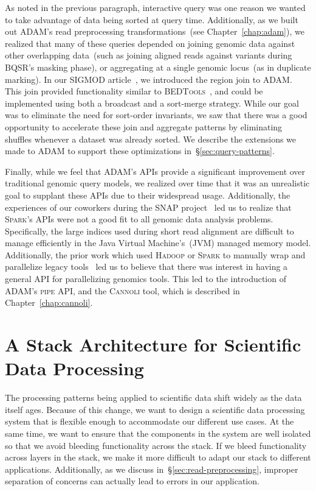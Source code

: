 \documentclass[phd]{ucbthesis}
\begin{document}
As noted in the previous paragraph, interactive query was one reason we wanted
to take advantage of data being sorted at query time. Additionally, as we built
out \textsc{ADAM}'s read preprocessing transformations~(see
Chapter~\ref{chap:adam}), we realized that many of these queries depended on
joining genomic data against other overlapping data~(such as joining aligned
reads against variants during BQSR's masking phase), or aggregating at a single
genomic locus~(as in duplicate marking). In our SIGMOD article~\cite{nothaft15},
we introduced the region join to \textsc{ADAM}. This join provided functionality
similar to \textsc{BEDTools}~\cite{quinlan10}, and could be implemented using
both a broadcast and a sort-merge strategy. While our goal was to eliminate the
need for sort-order invariants, we saw that there was a good opportunity to
accelerate these join and aggregate patterns by eliminating shuffles whenever
a dataset was already sorted. We describe the extensions we made to
\textsc{ADAM} to support these optimizations in~\S\ref{sec:query-patterns}.

Finally, while we feel that \textsc{ADAM}'s APIs provide a significant
improvement over traditional genomic query models, we realized over time that it
was an unrealistic goal to supplant these APIs due to their widespread usage.
Additionally, the experiences of our coworkers during the \textsc{SNAP}
project~\cite{zaharia11} led us to realize that \textsc{Spark}'s APIs were not
a good fit to all genomic data analysis problems. Specifically, the large
indices used during short read alignment are difficult to manage efficiently in
the Java Virtual Machine's~(JVM) managed memory model. Additionally, the prior
work which used \textsc{Hadoop} or \textsc{Spark} to manually wrap and
parallelize legacy tools~\cite{schatz09, langmead09crossbow, abuin15, abuin16,
  chen15, chen16} led us to believe that there was interest in having a general
API for parallelizing genomics tools. This led to the introduction of ADAM's
\textsc{pipe} API, and the \textsc{Cannoli} tool, which is described in
Chapter~\ref{chap:cannoli}.

\section{A Stack Architecture for Scientific Data Processing}
\label{sec:stack-architecture}

The processing patterns being applied to scientific data shift widely as the data itself ages. Because of
this change, we want to design a scientific data processing system that is flexible enough to
accommodate our different use cases. At the same time, we want to ensure that the components in the
system are well isolated so that we avoid bleeding functionality across the stack. If we bleed functionality
across layers in the stack, we make it more difficult to adapt our stack to different applications.
Additionally, as we discuss in~\S\ref{sec:read-preprocessing}, improper separation of concerns can
actually lead to errors in our application.
\end{document}

